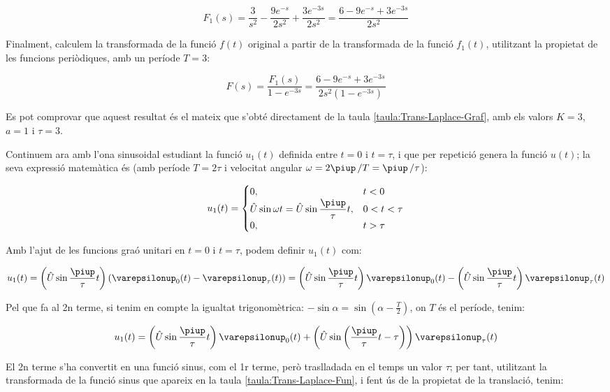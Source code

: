 \begin{exemple}[\CalcTransfLaplace{}]
    \[
        F_1(s) = \frac{3}{s^2} - \frac{9 e^{-s}}{2 s^2} + \frac{3 e^{-3s}}{2
        s^2} =\frac{6-9e^{-s}+3e^{-3s}}{2s^2}
    \]

    Finalment, calculem la transformada de la funció $f(t)$ original a
    partir de la transformada de la funció $f_1(t)$, utilitzant la
    propietat de les funcions periòdiques, amb un període $T=3$:

    \[
        F(s) = \frac{F_1(s)}{1-e^{-3s}} = \frac{6-9e^{-s}+3e^{-3s}}{2s^2(1-e^{-3s}) }
    \]

    Es pot comprovar que aquest resultat és el mateix que s'obté directament de la taula \vref{taula:Trans-Laplace-Graf}, amb els valors $K=3$, $a=1$ i $\tau=3$.

    Continuem ara  amb l'ona sinusoidal estudiant la funció $u_1(t)$
    definida entre $t=0$ i $t=\tau$, i que per repetició genera la
    funció $u(t)$; la seva expressió matemàtica és (amb període $T=
    2\tau$ i velocitat angular $\omega= 2\piup\,/T  = \piup\,/\tau$):

    \[
        u_1(t) = \begin{cases} 0, & t < 0\\ \hat{U}\sin\omega t =
        \hat{U}\sin\dfrac{\piup}{\tau}t,  & 0<t<\tau \\ 0, & t > \tau \end{cases}
    \]


    Amb l'ajut de les funcions graó unitari en $t=0$ i $t=\tau$, podem
    definir $u_1(t)$ com:

    \[
        u_1(t)=\left(\hat{U}\sin\frac{\piup}{\tau}t\right)(\varepsilonup_0(t)-\varepsilonup_\tau(t))
        =\left(\hat{U}\sin\frac{\piup}{\tau}t\right)\varepsilonup_0(t) - \left(\hat{U}\sin\frac{\piup}{\tau}t\right)\varepsilonup_\tau(t)
    \]

    Pel que fa al 2n  terme, si tenim en compte la igualtat
    trigonomètrica: $-\sin \alpha = \sin(\alpha-\frac{T}{2})$, on $T$ és
    el període, tenim:

    \[
        u_1(t) = \left(\hat{U}\sin\frac{\piup}{\tau}t\right)\varepsilonup_0(t) +
        \left(\hat{U}\sin\left(\frac{\piup}{\tau}t-\tau\right)\right)\varepsilonup_\tau(t)
    \]

    El 2n terme s'ha convertit en una funció sinus, com el 1r terme,
    però traslladada en el temps un valor $\tau$; per tant, utilitzant la
    transformada de la funció sinus que apareix en la taula
    \vref{taula:Trans-Laplace-Fun}, i fent ús de la propietat de la
    translació, tenim:


\end{exemple}
